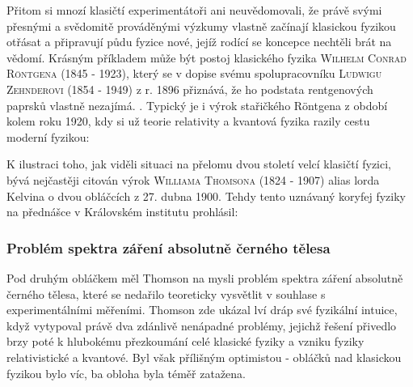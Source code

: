      Přitom si mnozí klasičtí experimentátoři ani neuvědomovali, že právě svými přesnými a
      svědomitě prováděnými výzkumy vlastně začínají klasickou fyzikou otřásat a připravují půdu
      fyzice nové, jejíž rodící se koncepce nechtěli brát na vědomí. Krásným příkladem může být
      postoj klasického fyzika \textsc{Wilhelm Conrad Röntgena} (1845 - 1923), který se v dopise
      svému spolupracovníku \textsc{Ludwigu Zehnderovi} (1854 - 1949) z r. 1896 přiznává, že ho
      podstata rentgenových paprsků vlastně nezajímá. \emph{}. Typický je i výrok stařičkého Röntgena
      z období kolem roku 1920, kdy si už teorie relativity a kvantová fyzika razily cestu moderní
      fyzikou: \emph{}
      
      K ilustraci toho, jak viděli situaci na přelomu dvou století velcí klasičtí fyzici, bývá
      nejčastěji citován výrok \textsc{Williama Thomsona} (1824 - 1907) alias lorda Kelvina o dvou
      obláčcích z 27. dubna 1900. Tehdy tento uznávaný koryfej fyziky na přednášce v Královském
      institutu prohlásil:
      
      
      \emph{}

      \subsubsection{Problém spektra záření absolutně černého tělesa}

        Pod druhým obláčkem měl Thomson na mysli problém spektra záření absolutně černého tělesa,
        které se nedařilo teoreticky vysvětlit v souhlase s experimentálními měřeními. Thomson zde
        ukázal lví dráp své fyzikální intuice, když vytypoval právě dva zdánlivě nenápadné problémy,
        jejichž řešení přivedlo brzy poté k hlubokému přezkoumání celé klasické fyziky a vzniku
        fyziky relativistické a kvantové. Byl však přílišným optimistou - obláčků nad klasickou
        fyzikou bylo víc, ba obloha byla téměř zatažena.
    
